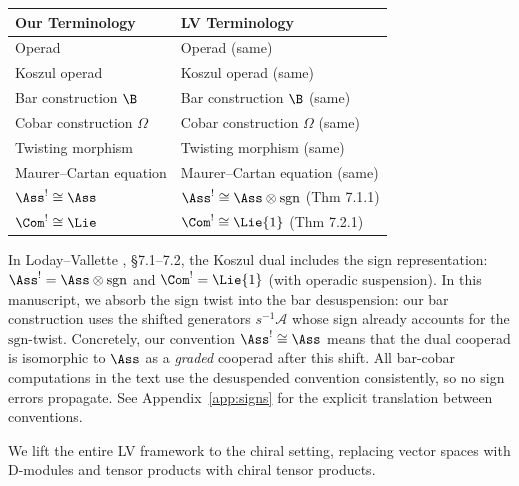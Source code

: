 \begin{tabular}{>{\raggedright\arraybackslash}p{}>{\raggedright\arraybackslash}p{}}
\textbf{Our Terminology} & \textbf{LV Terminology} \\
\hline
Operad & Operad (same) \\
Koszul operad & Koszul operad (same) \\
Bar construction $\B$ & Bar construction $\B$ (same) \\
Cobar construction $\Omega$ & Cobar construction $\Omega$ (same) \\
Twisting morphism & Twisting morphism (same) \\
Maurer--Cartan equation & Maurer--Cartan equation (same) \\
$\Ass^! \cong \Ass$ & $\Ass^! \cong \Ass \otimes \mathrm{sgn}$ (Thm 7.1.1) \\
$\Com^! \cong \Lie$ & $\Com^! \cong \Lie\{1\}$ (Thm 7.2.1) \\
\end{tabular}
\begin{remark}
In Loday--Vallette \cite{LV12}, \S7.1--7.2, the Koszul dual includes the sign representation: $\Ass^! = \Ass \otimes \mathrm{sgn}$ and $\Com^! = \Lie\{1\}$ (with operadic suspension). In this manuscript, we absorb the sign twist into the bar desuspension: our bar construction uses the shifted generators $s^{-1}\mathcal{A}$ whose sign already accounts for the $\mathrm{sgn}$-twist. Concretely, our convention $\Ass^! \cong \Ass$ means that the dual cooperad is isomorphic to $\Ass$ as a \emph{graded} cooperad after this shift. All bar-cobar computations in the text use the desuspended convention consistently, so no sign errors propagate. See Appendix~\ref{app:signs} for the explicit translation between conventions.
\end{remark}

\begin{remark}
We lift the entire LV framework to the chiral setting, replacing vector spaces with D-modules and tensor products with chiral tensor products.
\end{remark}

